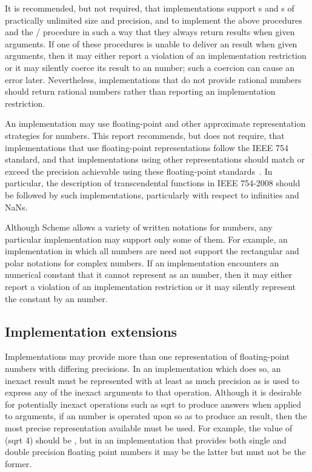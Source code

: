 \vest It is recommended, but not required, that implementations support
 s and  s of
practically unlimited size and precision, and to implement the
above procedures and the {\cf /} procedure in
such a way that they always return  results when given 
arguments.  If one of these procedures is unable to deliver an 
result when given  arguments, then it may either report a
violation of an
implementation restriction or it may silently coerce its result to an
 number; such a coercion can cause an error later.
Nevertheless, implementations that do not provide  rational
numbers should return  rational numbers rather than
reporting an implementation restriction.

\vest An implementation may use floating-point and other approximate 
representation strategies for  numbers.
This report recommends, but does not require, that 
implementations that use
floating-point representations
follow the IEEE 754 standard,
and that implementations using
other representations should match or exceed the precision achievable
using these floating-point standards~\cite{IEEE}.
In particular, the description of transcendental functions in IEEE 754-2008
should be followed by such implementations, particularly with respect
to infinities and NaNs.

Although Scheme allows a variety of written
notations for
numbers, any particular implementation may support only some of them.
For example, an implementation in which all numbers are 
need not support the rectangular and polar notations for complex
numbers.  If an implementation encounters an  numerical constant that
it cannot represent as an  number, then it may either report a
violation of an implementation restriction or it may silently represent the
constant by an  number.

\subsection{Implementation extensions}

\vest Implementations may provide more than one representation of
floating-point numbers with differing precisions.  In an implementation
which does so, an inexact result must be represented with at least
as much precision as is used to express any of the inexact arguments
to that operation.  Although it is desirable for potentially inexact
operations such as {\cf sqrt} to produce  answers when
applied to  arguments, if an  number is operated
upon so as to produce an  result, then the most precise
representation available must be used.  For example, the value of {\cf
(sqrt 4)} should be {}, but in an implementation that provides both
single and double precision floating point numbers it may be the latter
but must not be the former.

